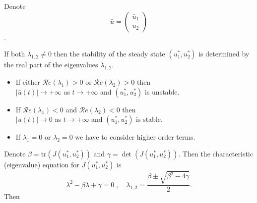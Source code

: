 \documentclass[
  letterpaper,
  DIV=11,
  numbers=noendperiod]{scrreprt}
\theoremstyle{plain}
\theoremstyle{definition}
\theoremstyle{plain}
\theoremstyle{remark}
\begin{document}
Denote \[\bar u=
\begin{pmatrix} \bar u_1 \\
\bar u_2 
\end{pmatrix}
\].

If both \(\lambda_{1,2} \neq 0\) then the stability of the steady state
\((u^\ast_1, u^\ast_2)\) is determined by the real part of the
eigenvalues \(\lambda_{1,2}\).

\begin{itemize}
\item
  If either \(\mathcal Re (\lambda_1)>0\) or
  \(\mathcal Re (\lambda_2)>0\) then\\
  \(|\bar u(t)| \to +\infty\) as \(t \to + \infty\) and
  \((u^\ast_1, u^\ast_2)\) is unstable.
\item
  If \(\mathcal Re (\lambda_1)<0\) and \(\mathcal Re (\lambda_2)<0\)
  then\\
  \(|\bar u(t)| \to 0\) as \(t \to + \infty\) and
  \((u^\ast_1, u^\ast_2)\) is stable.
\item
  If \(\lambda_1=0\) or \(\lambda_2=0\) we have to consider higher order
  terms.
\end{itemize}

Denote \(\beta = \textrm{tr} (J( u^\ast_1, u^\ast_2))\) and
\(\gamma= \det(J( u^\ast_1, u^\ast_2))\). Then the characteristic
(eigenvalue) equation for \(J( u^\ast_1, u^\ast_2)\) is \[
\lambda^2 - \beta \lambda + \gamma = 0 \; , \quad  \lambda_{1,2} = \frac{ \beta \pm \sqrt{ \beta^2 - 4 \gamma}} 2.
\] Then
\end{document}

